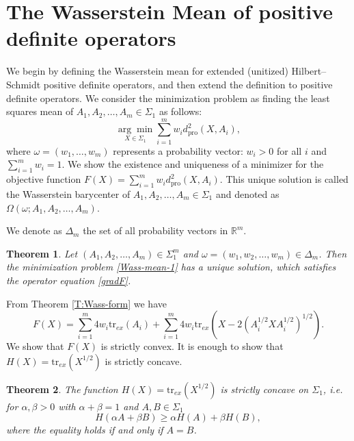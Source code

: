 \documentclass[12pt,reqno]{amsart}
\newtheorem{theorem}{Theorem}[section]
\begin{document}
\section{The Wasserstein Mean of  positive definite operators}

We begin by defining the Wasserstein mean for extended (unitized) Hilbert–Schmidt positive definite operators, and then extend the definition to positive definite operators. We consider the minimization problem as finding the least squares mean of $A_1, A_2 , \ldots, A_m \in \Sigma_1 $ as follows:
\begin{equation} \label{Wass-mean-1}
\underset{X \in \Sigma_1}{\arg \min} \sum_{i=1}^{m} w_i d_{\mathrm{pro}}^2(X, A_i),
\end{equation}
where $\omega = (w_1, \ldots, w_m)$ represents a probability vector: $w_i > 0$ for all $i$ and $\sum_{i=1}^{m} w_i = 1$. We show the existence and uniqueness of a minimizer for the objective function $F(X) = \sum_{i=1}^{m} w_i d_{\mathrm{pro}}^2(X, A_i)$. This unique solution is called the Wasserstein barycenter of $A_1, A_2, \ldots, A_m \in \Sigma_1$ and denoted as $\Omega(\omega; A_1, A_2, \ldots, A_m)$.



We denote as $\Delta_{m}$ the set of all probability vectors in $\mathbb{R}^{m}$.
\begin{theorem}
Let $(A_1, A_2, \ldots, A_m) \in \Sigma_1^m$ and $\omega = (w_{1}, w_{2}, \dots, w_{m}) \in \Delta_{m}$. Then the minimization problem \eqref{Wass-mean-1} has a unique solution, which satisfies the operator equation \eqref{gradF}.
\end{theorem}


From Theorem \ref{T:Wass-form} we have
\begin{equation*}\label{F}
F(X) = \sum_{i=1}^{m} 4 w_i \mathrm{tr}_{ex}(A_i) + \sum_{i=1}^{m} 4 w_i \mathrm{tr}_{ex}(X -2 (A_i^{1/2} XA_i^{1/2})^{1/2}).
\end{equation*}
We show that $F(X)$ is strictly convex. It is enough to show that $H(X) = \mathrm{tr}_{ex}(X^{1/2})$ is strictly concave.

\begin{theorem}
The function $H(X) = \mathrm{tr}_{ex}(X^{1/2})$ is strictly concave on $\Sigma_1$, i.e. for $\alpha, \beta > 0$ with $\alpha + \beta = 1$ and $A, B \in \Sigma_1$
\begin{displaymath}
H(\alpha A + \beta B) \geq \alpha H(A) + \beta H(B),
\end{displaymath}
where the equality holds if and only if $A = B$.
\end{theorem}
\end{document}
